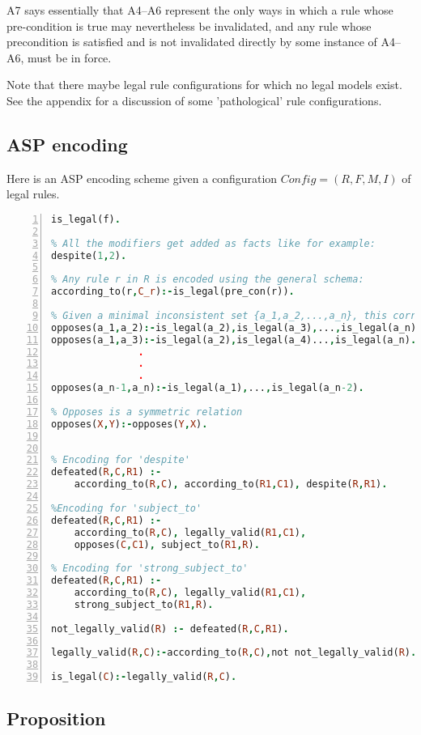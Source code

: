 A7 says essentially that A4--A6 represent the only ways in which a rule whose pre-condition is true may nevertheless be invalidated, and any rule whose precondition is satisfied and is not invalidated directly by some instance of A4--A6, must be in force. 

Note that there maybe legal rule configurations for which no legal models exist. See the appendix for a discussion of some 'pathological' rule configurations.

\subsection{ASP encoding}
Here is an ASP encoding scheme given a configuration $Config = (R,F,M,I)$ of legal rules.
\begin{lstlisting}[language=Prolog, numbers=left]
% For any f in F, we have:
is_legal(f). 

% All the modifiers get added as facts like for example:
despite(1,2).

% Any rule r in R is encoded using the general schema:
according_to(r,C_r):-is_legal(pre_con(r)).

% Given a minimal inconsistent set {a_1,a_2,...,a_n}, this corresponds to a set of rules:
opposes(a_1,a_2):-is_legal(a_2),is_legal(a_3),...,is_legal(a_n).
opposes(a_1,a_3):-is_legal(a_2),is_legal(a_4)...,is_legal(a_n).
               .
               .
               .
opposes(a_n-1,a_n):-is_legal(a_1),...,is_legal(a_n-2).               

% Opposes is a symmetric relation
opposes(X,Y):-opposes(Y,X).


% Encoding for 'despite'
defeated(R,C,R1) :-
    according_to(R,C), according_to(R1,C1), despite(R,R1).

%Encoding for 'subject_to'
defeated(R,C,R1) :-
    according_to(R,C), legally_valid(R1,C1),
    opposes(C,C1), subject_to(R1,R).

% Encoding for 'strong_subject_to'
defeated(R,C,R1) :-
    according_to(R,C), legally_valid(R1,C1),
    strong_subject_to(R1,R).

not_legally_valid(R) :- defeated(R,C,R1).

legally_valid(R,C):-according_to(R,C),not not_legally_valid(R).

is_legal(C):-legally_valid(R,C).
\end{lstlisting}
\subsection{Proposition}

